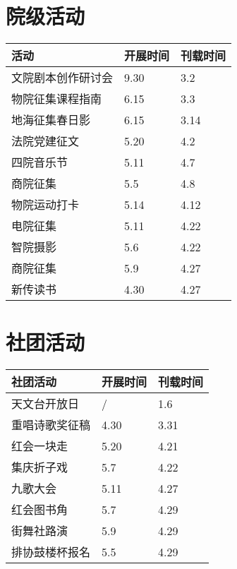 \documentclass[letterpaper, 12pt]{article}
\begin{document}
\begin{multicols}{2}
\section{院级活动}
\begin{tabular}{|>{\centering\arraybackslash}m{}|m{}|m{}|}
\hline
    活动 & 开展时间 & 刊载时间\\
    \hline\hline
    文院剧本创作研讨会 & 9.30 & 3.2\\
    物院征集课程指南 & 6.15 & 3.3\\
    地海征集春日影 & 6.15 & 3.14\\
    法院党建征文 & 5.20 & 4.2\\
    四院音乐节 & 5.11 & 4.7\\
    商院征集 & 5.5 & 4.8\\
    物院运动打卡 & 5.14 & 4.12\\
    电院征集 & 5.11 & 4.22\\
    智院摄影 & 5.6 & 4.22\\
    商院征集 & 5.9 & 4.27\\
    新传读书 & 4.30 & 4.27\\
    \hline
\end{tabular}

\section{社团活动}
\begin{tabular}{|>{\centering\arraybackslash}m{}|m{}|m{}|}
    \hline
    社团活动 & 开展时间 & 刊载时间\\
    \hline\hline
    天文台开放日 & / & 1.6\\
    重唱诗歌奖征稿 & 4.30 & 3.31\\
    红会一块走 & 5.20 & 4.21\\
    集庆折子戏 & 5.7 & 4.22\\
    九歌大会 & 5.11 & 4.27\\
    红会图书角 & 5.7 & 4.29\\
    街舞社路演 & 5.9 & 4.29\\
    排协鼓楼杯报名 & 5.5 & 4.29\\
    \hline
\end{tabular}

\end{multicols}
\end{document}
